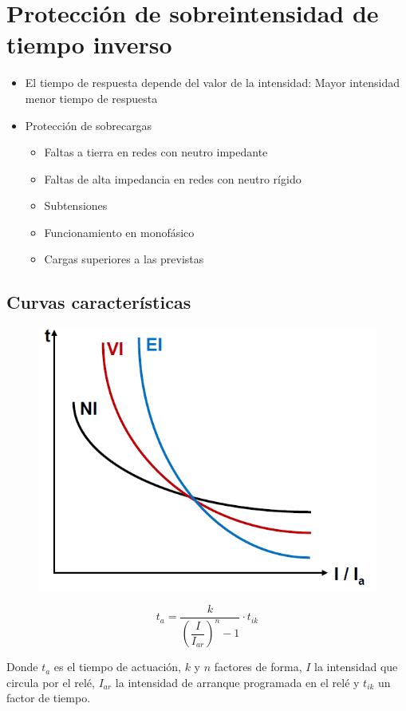 \section{Protección de sobreintensidad de tiempo inverso}
\begin{itemize}
	\item El tiempo de respuesta depende del valor de la intensidad:
	Mayor intensidad menor tiempo de respuesta
	\item Protección de sobrecargas
	\begin{itemize}
		\item Faltas a tierra en redes con neutro impedante
		\item Faltas de alta impedancia en redes con neutro rígido
		\item Subtensiones
		\item Funcionamiento en monofásico
		\item Cargas superiores a las previstas
	\end{itemize}
\end{itemize}
\subsection{Curvas características}
\begin{figure}[H]
	\centering
	\includegraphics[width=0.7\linewidth]{Images/61}
	\label{fig:61}
\end{figure}
\begin{equation}
	t_a=\dfrac{k}{\left(\dfrac{I}{I_{ar}}\right)^n-1}\cdot t_{ik}
\end{equation}

Donde $t_a$ es el tiempo de actuación, $k$ y $n$ factores de forma, $I$ la intensidad que circula por el relé, $I_{ar}$ la intensidad de arranque programada en el relé y $t_{ik}$ un factor de tiempo.
\newline

